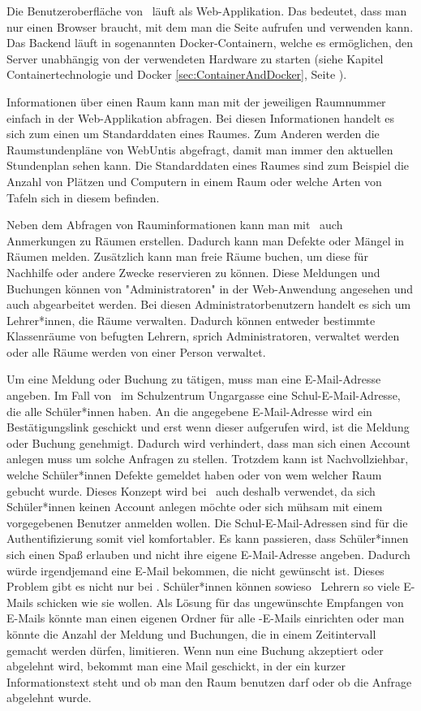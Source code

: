Die Benutzeroberfläche von \ZELIA\ läuft als Web-Applikation. Das bedeutet, dass man nur einen Browser braucht, mit dem man die Seite aufrufen und verwenden kann. Das Backend läuft in sogenannten Docker-Containern, welche es ermöglichen, den Server unabhängig von der verwendeten Hardware zu starten (siehe Kapitel Containertechnologie und Docker \ref{sec:ContainerAndDocker}, Seite \pageref{sec:ContainerAndDocker}).

Informationen über einen Raum kann man mit der jeweiligen Raumnummer einfach in der Web-Applikation abfragen. Bei diesen Informationen handelt es sich zum einen um Standarddaten eines Raumes. Zum Anderen werden die Raumstundenpläne von WebUntis abgefragt, damit man immer den aktuellen Stundenplan sehen kann. Die Standarddaten eines Raumes sind zum Beispiel die Anzahl von Plätzen und Computern in einem Raum oder welche Arten von Tafeln sich in diesem befinden.

Neben dem Abfragen von Rauminformationen kann man mit \ZELIA\ auch Anmerkungen zu Räumen erstellen. Dadurch kann man Defekte oder Mängel in Räumen melden. Zusätzlich kann man freie Räume buchen, um diese für Nachhilfe oder andere Zwecke reservieren zu können. Diese Meldungen und Buchungen können von "Administratoren" in der Web-Anwendung angesehen und auch abgearbeitet werden. Bei diesen Administratorbenutzern handelt es sich um Lehrer*innen, die Räume verwalten. Dadurch können entweder bestimmte Klassenräume von befugten Lehrern, sprich Administratoren, verwaltet werden oder alle Räume werden von einer Person verwaltet.

Um eine Meldung oder Buchung zu tätigen, muss man eine E-Mail-Adresse angeben. Im Fall von \ZELIA\ im Schulzentrum Ungargasse eine Schul-E-Mail-Adresse, die alle Schüler*innen haben. An die angegebene E-Mail-Adresse wird ein Bestätigungslink geschickt und erst wenn dieser aufgerufen wird, ist die Meldung oder Buchung genehmigt. Dadurch wird verhindert, dass man sich einen Account anlegen muss um solche Anfragen zu stellen. Trotzdem kann ist Nachvollziehbar, welche Schüler*innen Defekte gemeldet haben oder von wem welcher Raum gebucht wurde. Dieses Konzept wird bei \ZELIA\ auch deshalb verwendet, da sich Schüler*innen keinen Account anlegen möchte oder sich mühsam mit einem vorgegebenen Benutzer anmelden wollen. Die Schul-E-Mail-Adressen sind für die Authentifizierung somit viel komfortabler. Es kann passieren, dass Schüler*innen sich einen Spaß erlauben und nicht ihre eigene E-Mail-Adresse angeben. Dadurch würde irgendjemand eine E-Mail bekommen, die nicht gewünscht ist. Dieses Problem gibt es nicht nur bei \ZELIA. Schüler*innen können sowieso \zb\ Lehrern so viele E-Mails schicken wie sie wollen. Als Lösung für das ungewünschte Empfangen von E-Mails könnte man einen eigenen Ordner für alle \ZELIA-E-Mails einrichten oder man könnte die Anzahl der Meldung und Buchungen, die in einem Zeitintervall gemacht werden dürfen, limitieren. Wenn nun eine Buchung akzeptiert oder abgelehnt wird, bekommt man eine Mail geschickt, in der ein kurzer Informationstext steht und ob man den Raum benutzen darf oder ob die Anfrage abgelehnt wurde.

